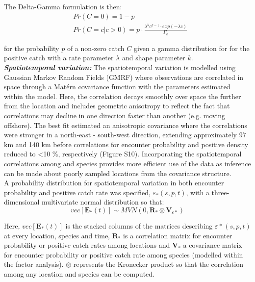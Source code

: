 \documentclass[fleqn,10pt]{wlscirep}
\begin{document}
\begin{linenumbers}
The Delta-Gamma formulation is then:
\begin{equation}
	\begin{split}
	& Pr(C = 0) = 1 - p \\
	& Pr(C = c | c > 0) = p \cdot \frac{\lambda^{k}c^{k-1} \cdot exp(-\lambda c)}{\Gamma_{k}}
	\end{split}
\end{equation}

for the probability $p$ of a non-zero catch $C$ given a gamma distribution for
for the positive catch with a rate parameter $\lambda$ and shape parameter
$k$.\\

\textbf{\textit{Spatiotemporal variation:}} The spatiotemporal variation is
modelled using Gaussian Markov Random Fields (GMRF) where observations are
correlated in space through a Matérn covariance function with the parameters
estimated within the model. Here, the correlation decays smoothly over space
the further from the location and includes geometric anisotropy to reflect the
fact that correlations may decline in one direction faster than another (e.g.
moving offshore)\cite{Thorson2013}.  The best fit estimated an anisotropic
covariance where the correlations were stronger in a north-east - south-west
direction, extending approximately 97 km and 140 km before correlations for
encounter probability and positive density reduced to \textless 10 \%,
respectively (Figure S10).  Incorporating the spatiotemporal correlations among
and species provides more efficient use of the data as inference can be made
about poorly sampled locations from the covariance structure.\\

A probability distribution for spatiotemporal variation in both encounter
probability and positive catch rate was specified, $\varepsilon_{*}(s,p,t)$,
with a three-dimensional multivariate normal distribution so that:
	\begin{equation}
		vec[\mathbf{E}_{*}(t)] \sim MVN(0,\mathbf{R}_{*} \otimes
		\mathbf{V}_{{\varepsilon}{*}})
	\end{equation}

Here, $vec[\mathbf{E}_{*}(t)]$ is the stacked columns of the matrices
describing $\varepsilon{*}(s,p,t)$ at every location, species and time,
$\mathbf{R}_{*}$ is a correlation matrix for encounter probability or positive
catch rates among locations and $\mathbf{V}_{*}$ a covariance matrix for
encounter probability or positive catch rate among species (modelled within the
factor analysis). $\otimes$ represents the Kronecker product so that the
correlation among any location and species can be computed\cite{Thorson2017}.\\
		

\end{linenumbers}
\end{document}
